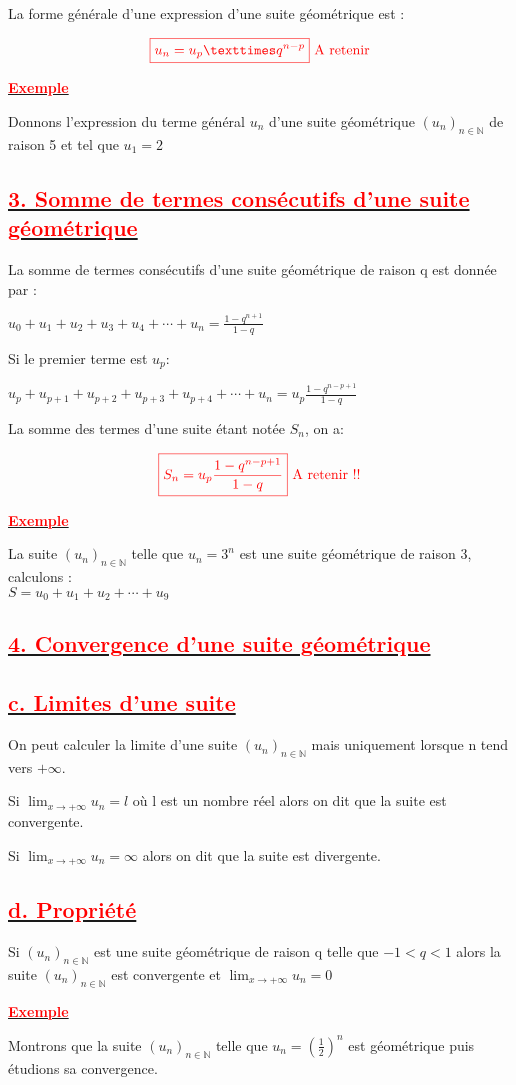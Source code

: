 \documentclass[12pt]{article}
\begin{document}
La forme générale d'une expression d'une suite géométrique est :  

\[\textcolor{red}{\boxed{u_{n} = u_{p} × q^{n-p}} \text{ A retenir}}\]

\underline{\textbf{\textcolor{red}{Exemple}}}

Donnons l’expression du terme général $u_{n}$ d’une suite géométrique $(u_{n})_{n\in\mathbb{N}}$ de raison 5 et tel que $u_{1} = 2$
\subsection*{\underline{\textbf{\textcolor{red}{3. Somme de termes consécutifs d’une suite géométrique}}}}
La somme de termes consécutifs d’une suite géométrique de raison q est donnée par :

$u_{0}+u_{1}+u_{2}+u_{3}+u_{4}+\cdots+u_{n}=\frac{1-q^{n+1}}{1-q}$

Si le premier terme  est $u_{p}$:

$u_{p}+u_{p+1}+u_{p+2}+u_{p+3}+u_{p+4}+\cdots+u_{n}=u_{p}\frac{1-q^{n-p+1}}{1-q}$

La somme des termes d'une suite étant notée $S_{n}$, on a:

\[\textcolor{red}{\boxed{S_{n}=u_{p}\frac{1-q^{n-p+1}}{1-q}}\text{ A retenir !!}}\]

\underline{\textbf{\textcolor{red}{Exemple}}}

La suite $(u_{n})_{n\in\mathbb{N}}$ telle que $u_{n} =3^{n}$ est une suite géométrique de raison 3, calculons :\\
$S = u_{0} + u_{1} + u_{2} +\cdots+u_{9}$
\subsection*{\underline{\textbf{\textcolor{red}{4. Convergence d’une suite géométrique}}}}
\subsection*{\underline{\textbf{\textcolor{red}{c. Limites d’une suite}}}}
On peut calculer la limite d’une suite $(u_{n})_{n\in\mathbb{N}}$ mais uniquement lorsque n tend vers $+\infty$.

Si $\lim_{x \to +\infty}u_{n} = l$ où l est un nombre réel alors on dit que la suite est convergente.

Si $\lim_{x \to +\infty}u_{n} = \infty$ alors on dit que la suite est divergente.
\subsection*{\underline{\textbf{\textcolor{red}{d. Propriété}}}}
Si $(u_{n})_{n\in\mathbb{N}}$ est une suite géométrique de raison q telle que $-1 < q < 1$ alors la suite 
$(u_{n})_{n\in\mathbb{N}}$ est convergente et $\lim_{x \to +\infty}u_{n} = 0$

\underline{\textbf{\textcolor{red}{Exemple}}}

Montrons que la suite $(u_{n})_{n\in\mathbb{N}}$ telle que $u_{n}=(\frac{1}{2})^{n}$ est géométrique puis étudions sa convergence.
\end{document}
